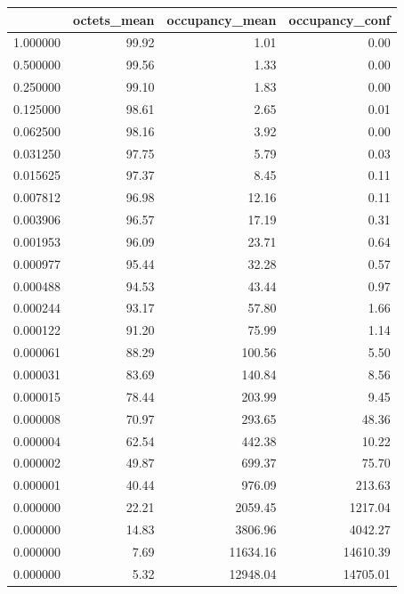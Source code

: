 \begin{tabular}{lrrr}
\toprule
 & octets_mean & occupancy_mean & occupancy_conf \\
\midrule
1.000000 & 99.92 & 1.01 & 0.00 \\
0.500000 & 99.56 & 1.33 & 0.00 \\
0.250000 & 99.10 & 1.83 & 0.00 \\
0.125000 & 98.61 & 2.65 & 0.01 \\
0.062500 & 98.16 & 3.92 & 0.00 \\
0.031250 & 97.75 & 5.79 & 0.03 \\
0.015625 & 97.37 & 8.45 & 0.11 \\
0.007812 & 96.98 & 12.16 & 0.11 \\
0.003906 & 96.57 & 17.19 & 0.31 \\
0.001953 & 96.09 & 23.71 & 0.64 \\
0.000977 & 95.44 & 32.28 & 0.57 \\
0.000488 & 94.53 & 43.44 & 0.97 \\
0.000244 & 93.17 & 57.80 & 1.66 \\
0.000122 & 91.20 & 75.99 & 1.14 \\
0.000061 & 88.29 & 100.56 & 5.50 \\
0.000031 & 83.69 & 140.84 & 8.56 \\
0.000015 & 78.44 & 203.99 & 9.45 \\
0.000008 & 70.97 & 293.65 & 48.36 \\
0.000004 & 62.54 & 442.38 & 10.22 \\
0.000002 & 49.87 & 699.37 & 75.70 \\
0.000001 & 40.44 & 976.09 & 213.63 \\
0.000000 & 22.21 & 2059.45 & 1217.04 \\
0.000000 & 14.83 & 3806.96 & 4042.27 \\
0.000000 & 7.69 & 11634.16 & 14610.39 \\
0.000000 & 5.32 & 12948.04 & 14705.01 \\
\bottomrule
\end{tabular}
